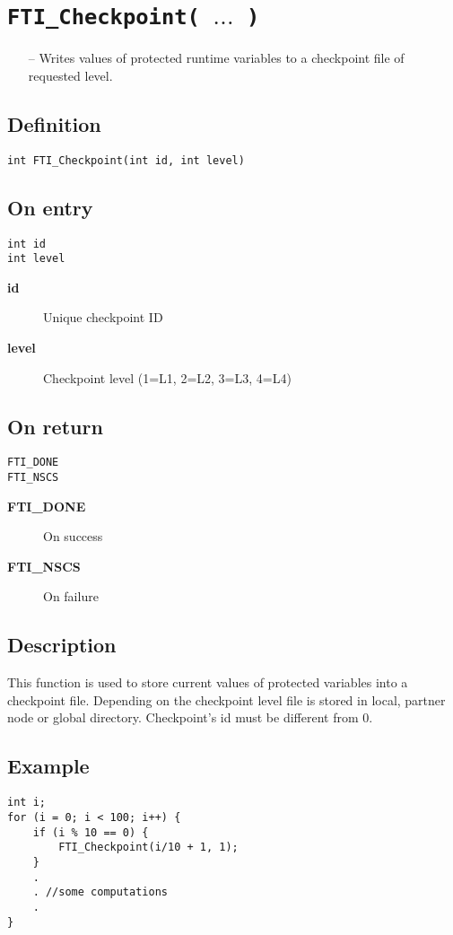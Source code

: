 \documentclass{refrep}
\begin{document}
\section{\tt FTI\_Checkpoint( $\dots$ )}\label{sec:fticheckpoint}
\begin{framed}
\begin{itemize}
\item[--] Writes values of protected runtime variables to a checkpoint file of requested level.
\end{itemize}
\end{framed}
\subsection*{Definition}
\begin{lstlisting}[frame=single]
int FTI_Checkpoint(int id, int level)
\end{lstlisting}
\subsection*{On entry}
\begin{lstlisting}[frame=single]
int id
int level
\end{lstlisting}
\begin{description}
\item[\textbf{id}] Unique checkpoint ID
\item[\textbf{level}] Checkpoint level (1=L1, 2=L2, 3=L3, 4=L4)
\end{description}
\subsection*{On return}
\begin{lstlisting}[frame=single]
FTI_DONE
FTI_NSCS
\end{lstlisting}
\begin{description}
\item[\textbf{FTI\_DONE}] On success
\item[\textbf{FTI\_NSCS}] On failure
\end{description}
\subsection*{Description}
This function is used to store current values of protected variables into a checkpoint file. Depending on the checkpoint level file is stored in local, partner node or global directory. Checkpoint's id must be different from 0.
\subsection*{Example}
\begin{center}
\begin{lstlisting}[frame=single]
int i;
for (i = 0; i < 100; i++) {
    if (i % 10 == 0) {
        FTI_Checkpoint(i/10 + 1, 1);
    }
    .
    . //some computations
    .
}
\end{lstlisting}
\end{center}
\newpage
\end{document}
